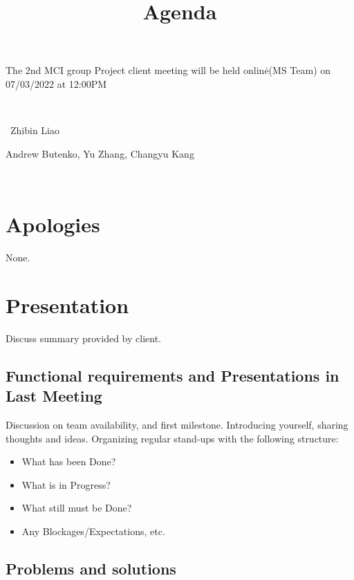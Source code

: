\documentclass{article}
\newcommand{\tmtextbf}[1]{\text{{\bfseries{#1}}}}
\newenvironment{itemizedot}{\begin{itemize} \renewcommand{\labelitemi}{$\bullet$}\renewcommand{\labelitemii}{$\bullet$}\renewcommand{\labelitemiii}{$\bullet$}\renewcommand{\labelitemiv}{$\bullet$}}{\end{itemize}}
\begin{document}
\noindent The 2nd MCI group Project client meeting will be held online\.{}(MS Team) on 07/03/2022 at 12:00PM

\

\title{Agenda}
\author{}
\date{}
\pagestyle{empty}
{\let\newpage\relax\maketitle}

\noindent\tmtextbf{Chair:} \ Zhibin Liao

\noindent\tmtextbf{Members:} Andrew Butenko, Yu Zhang, Changyu Kang

\

\section{Apologies}

None.

\section{Presentation}

Discuss summary provided by client.

\subsection{Functional requirements and Presentations in Last Meeting}

Discussion on team availability, and first milestone. Introducing yourself,
sharing thoughts and ideas. Organizing regular stand-ups with the following structure:
\begin{itemizedot}
  \item What has been Done?
  
  \item What is in Progress?
  
  \item What still must be Done?
  
  \item Any Blockages/Expectations, etc.
\end{itemizedot}

\subsection{Problems and solutions}
\end{document}
